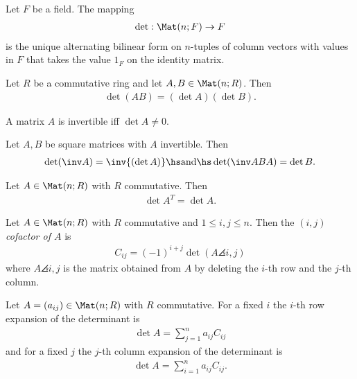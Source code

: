 \documentclass{article}
\begin{document}
\begin{theorem}[Theorem 4.3.6]
	Let $F$ be a field. The mapping
	\begin{align*}
		\det : \Mat(n; F) \to F
	\end{align*}
	is the unique alternating bilinear form on $n$-tuples of column vectors with values in $F$
	that takes the value $1_F$ on the identity matrix.
\end{theorem}

\begin{theorem}[Theorem 4.4.1]
	Let $R$ be a commutative ring and let $A,B\in\Mat(n; R)$. Then
	\begin{align*}
		\det (AB) = (\det A) (\det B).
	\end{align*}
\end{theorem}

\begin{theorem}[Theorem 4.4.2]
	A matrix $A$ is invertible iff $\det A \not= 0$.
\end{theorem}

\begin{corollary}
	Let $A,B$ be square matrices with $A$ invertible. Then
	\begin{align*}
		\det (\inv A) = \inv{(\det A)} \hs\text{and}\hs
		\det (\inv ABA) = \det B.
	\end{align*}
\end{corollary}

\begin{lemma}[Lemma 4.4.4]
	Let $A\in\Mat(n;R)$ with $R$ commutative. Then
	\begin{align*}
		\det A^T = \det A.
	\end{align*}
\end{lemma}

\begin{definition}
	Let $A\in\Mat(n;R)$ with $R$ commutative and $1\leq i,j\leq n$.  Then the \emph{$(i,j)$ cofactor of $A$} is
	\begin{align*}
		C_{ij}=(-1)^{i+j}\det(A\angles{i,j})
	\end{align*}
	where $A\angles{i,j}$ is the matrix obtained from $A$ by deleting the $i$-th row and the $j$-th column.
\end{definition}

\begin{theorem}[Theorem 4.4.7]
	Let $A=(a_{ij})\in\Mat(n; R)$ with $R$ commutative. For a fixed $i$ the $i$-th row expansion
	of the determinant is
	\begin{align*}
		\det A = \sum_{j=1}^n a_{ij}C_{ij}
	\end{align*}
	and for a fixed $j$ the $j$-th column expansion of the determinant is
	\begin{align*}
		\det A = \sum_{i=1}^n a_{ij}C_{ij}.
	\end{align*}
\end{theorem}
\end{document}
